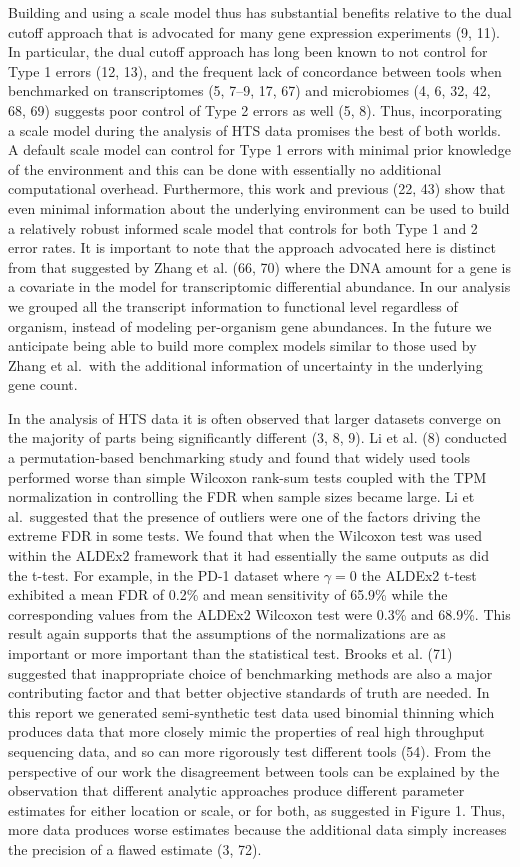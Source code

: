 \documentclass[
]{article}
\begin{document}
Building and using a scale model thus has substantial benefits relative
to the dual cutoff approach that is advocated for many gene expression
experiments (9, 11). In particular, the dual cutoff approach has long
been known to not control for Type 1 errors (12, 13), and the frequent
lack of concordance between tools when benchmarked on transcriptomes (5,
7--9, 17, 67) and microbiomes (4, 6, 32, 42, 68, 69) suggests poor
control of Type 2 errors as well (5, 8). Thus, incorporating a scale
model during the analysis of HTS data promises the best of both worlds.
A default scale model can control for Type 1 errors with minimal prior
knowledge of the environment and this can be done with essentially no
additional computational overhead. Furthermore, this work and previous
(22, 43) show that even minimal information about the underlying
environment can be used to build a relatively robust informed scale
model that controls for both Type 1 and 2 error rates. It is important
to note that the approach advocated here is distinct from that suggested
by Zhang et al. (66, 70) where the DNA amount for a gene is a covariate
in the model for transcriptomic differential abundance. In our analysis
we grouped all the transcript information to functional level regardless
of organism, instead of modeling per-organism gene abundances. In the
future we anticipate being able to build more complex models similar to
those used by Zhang et al.~with the additional information of
uncertainty in the underlying gene count.

In the analysis of HTS data it is often observed that larger datasets
converge on the majority of parts being significantly different (3, 8,
9). Li et al. (8) conducted a permutation-based benchmarking study and
found that widely used tools performed worse than simple Wilcoxon
rank-sum tests coupled with the TPM normalization in controlling the FDR
when sample sizes became large. Li et al.~suggested that the presence of
outliers were one of the factors driving the extreme FDR in some tests.
We found that when the Wilcoxon test was used within the ALDEx2
framework that it had essentially the same outputs as did the t-test.
For example, in the PD-1 dataset where \(\gamma = 0\) the ALDEx2 t-test
exhibited a mean FDR of 0.2\% and mean sensitivity of 65.9\% while the
corresponding values from the ALDEx2 Wilcoxon test were 0.3\% and
68.9\%. This result again supports that the assumptions of the
normalizations are as important or more important than the statistical
test. Brooks et al. (71) suggested that inappropriate choice of
benchmarking methods are also a major contributing factor and that
better objective standards of truth are needed. In this report we
generated semi-synthetic test data used binomial thinning which produces
data that more closely mimic the properties of real high throughput
sequencing data, and so can more rigorously test different tools (54).
From the perspective of our work the disagreement between tools can be
explained by the observation that different analytic approaches produce
different parameter estimates for either location or scale, or for both,
as suggested in Figure 1. Thus, more data produces worse estimates
because the additional data simply increases the precision of a flawed
estimate (3, 72).
\end{document}
